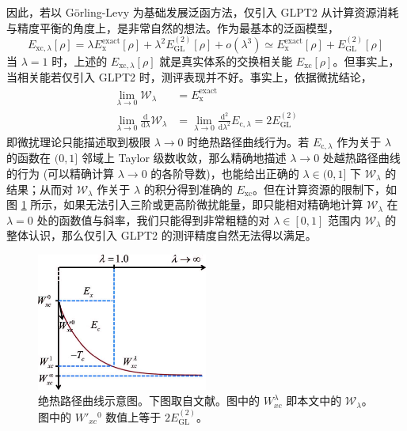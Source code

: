 因此，若以 G\"orling-Levy 为基础发展泛函方法，仅引入 GLPT2 从计算资源消耗与精度平衡的角度上，是非常自然的想法。作为最基本的泛函模型，
\begin{equation}
  E_{\mathrm{xc}, \lambda} [\rho] = \lambda E_\mathrm{x}^\mathrm{exact}[\rho] + \lambda^2 E_\mathrm{GL}^{(2)} [\rho] + o(\lambda^3) \simeq E_\mathrm{x}^\mathrm{exact}[\rho] + E_\mathrm{GL}^{(2)} [\rho]
\end{equation}
当 $\lambda = 1$ 时，上述的 $E_{\mathrm{xc}, \lambda} [\rho]$ 就是真实体系的交换相关能 $E_{\mathrm{xc}} [\rho]$。但事实上，当相关能若仅引入 GLPT2 时，测评表现并不好\cite{Su-Xu.JCP.2014}。事实上，依据微扰结论，
\begin{align}
  \lim_{\lambda \rightarrow 0} \mathcal{W}_{\lambda} &= E_\mathrm{x}^\mathrm{exact} \\
  \lim_{\lambda \rightarrow 0} \frac{\mathrm{d}}{\mathrm{d} \lambda} \mathcal{W}_{\lambda} &= \lim_{\lambda \rightarrow 0} \frac{\mathrm{d}^2}{\mathrm{d} \lambda^2} E_{\mathrm{c}, \lambda} = 2 E_\mathrm{GL}^{(2)}
\end{align}
即微扰理论只能描述取到极限 $\lambda \rightarrow 0$ 时绝热路径曲线行为。若 $E_{\mathrm{c}, \lambda}$ 作为关于 $\lambda$ 的函数在 $(0, 1]$ 邻域上 Taylor 级数收敛，那么精确地描述 $\lambda \rightarrow 0$ 处越热路径曲线的行为 (可以精确计算 $\lambda \rightarrow 0$ 的各阶导数)，也能给出正确的 $\lambda \in (0, 1]$ 下 $\mathcal{W}_{\lambda}$ 的结果；从而对 $\mathcal{W}_{\lambda}$ 作关于 $\lambda$ 的积分得到准确的 $E_\mathrm{xc}$。但在计算资源的限制下，如图 \ref{fig.2.adiabatic-curve} 所示，如果无法引入三阶或更高阶微扰能量，即只能相对精确地计算 $\mathcal{W}_{\lambda}$ 在 $\lambda = 0$ 处的函数值与斜率，我们只能得到非常粗糙的对 $\lambda \in [0, 1]$ 范围内 $\mathcal{W}_{\lambda}$ 的整体认识，那么仅引入 GLPT2 的测评精度自然无法得以满足。

\begin{figure}[h]
  \centering
  \includegraphics[width=0.5\textwidth]{assets/adiabatic-curve.jpg}
  \caption{绝热路径曲线示意图。下图取自文献\cite{Su-Xu.JCP.2014}。图中的 $W_{xc}^{\lambda}$ 即本文中的 $\mathcal{W}_{\lambda}$。图中的 $W'_{xc}{}^{0}$ 数值上等于 $2 E_\mathrm{GL}^{(2)}$。}
  \label{fig.2.adiabatic-curve}
\end{figure}

